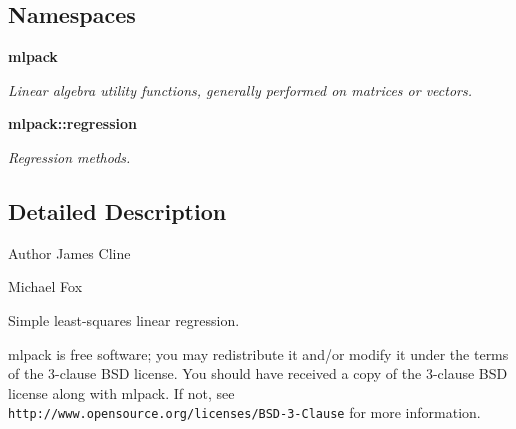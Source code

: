\subsection*{Namespaces}
\begin{DoxyCompactItemize}
\item 
 {\bf mlpack}
\begin{DoxyCompactList}\small\item\em Linear algebra utility functions, generally performed on matrices or vectors. \end{DoxyCompactList}\item 
 {\bf mlpack\+::regression}
\begin{DoxyCompactList}\small\item\em Regression methods. \end{DoxyCompactList}\end{DoxyCompactItemize}


\subsection{Detailed Description}
\begin{DoxyAuthor}{Author}
James Cline 

Michael Fox
\end{DoxyAuthor}
Simple least-\/squares linear regression.

mlpack is free software; you may redistribute it and/or modify it under the terms of the 3-\/clause B\+SD license. You should have received a copy of the 3-\/clause B\+SD license along with mlpack. If not, see {\tt http\+://www.\+opensource.\+org/licenses/\+B\+S\+D-\/3-\/\+Clause} for more information. 